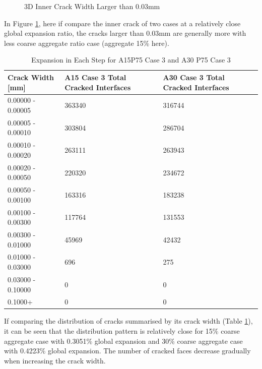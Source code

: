 \begin{figure}[!h]
  \caption{3D Inner Crack Width Larger than 0.03mm}
  \label{fig:ASR_A15P75_crack}
\end{figure}

In Figure \ref{fig:ASR_A15P75_crack}, here if compare the inner crack of two cases at a relatively close global expansion ratio, the cracks larger than 0.03mm are generally more with less coarse aggregate ratio case (aggregate 15\% here). 



\begin{table}[!h]
\centering
\begin{tabular}{ ||p{4cm}|p{4cm}|p{4cm}|| }
\hline
 Crack Width [mm] &  A15 Case 3 Total Cracked Interfaces &  A30 Case 3 Total Cracked Interfaces \\
 \hline\hline

   0.00000 - 0.00005 & 363340 & 316744 \\
   0.00005 - 0.00010 & 303804 & 286704 \\
   0.00010 - 0.00020 & 263111 & 263943 \\
   0.00020 - 0.00050 & 220320 & 234672 \\
   0.00050 - 0.00100 & 163316 & 183238 \\
   0.00100 - 0.00300 & 117764 & 131553 \\
   0.00300 - 0.01000 & 45969 & 42432 \\
   0.01000 - 0.03000 & 696 & 275 \\
   0.03000 - 0.10000 & 0 & 0 \\
   0.1000+ & 0 & 0 \\

  \hline
  \end{tabular}
\caption{Expansion in Each Step for A15P75 Case 3 and A30 P75 Case 3}
\label{table:A15vsA30P75_3_Cracks}
\end{table}


If comparing the distribution of cracks summarised by its crack width (Table \ref{table:A15vsA30P75_3_Cracks}),  it can be seen that the distribution pattern is relatively close for 15\% coarse aggregate case with 0.3051\% global expansion and  30\% coarse aggregate case with 0.4223\% global expansion.  The number of cracked faces decrease gradually when increasing the crack width.

